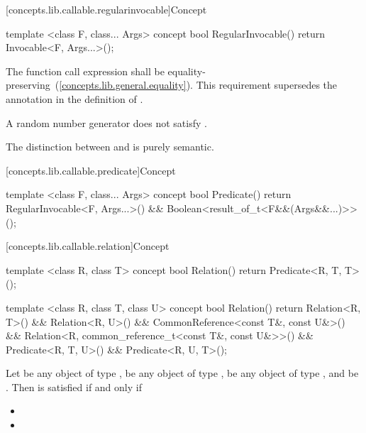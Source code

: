 [concepts.lib.callable.regularinvocable]{Concept }

%
\begin{itemdecl}
template <class F, class... Args>
concept bool RegularInvocable() {
  return Invocable<F, Args...>();
}
\end{itemdecl}

\begin{itemdescr}
\pnum
The  function call expression shall be
equality-preserving~(\ref{concepts.lib.general.equality}). \enternote This requirement supersedes the
annotation in the definition of . \exitnote

\pnum
\enternote A random number generator does not satisfy
.\exitnote

\pnum
\enternote The distinction between  and
 is purely semantic.\exitnote
\end{itemdescr}

[concepts.lib.callable.predicate]{Concept }

%
\begin{itemdecl}
template <class F, class... Args>
concept bool Predicate() {
  return RegularInvocable<F, Args...>() &&
    Boolean<result_of_t<F&&(Args&&...)>>();
}
\end{itemdecl}

[concepts.lib.callable.relation]{Concept }

%
\begin{itemdecl}
template <class R, class T>
concept bool Relation() {
  return Predicate<R, T, T>();
}

template <class R, class T, class U>
concept bool Relation() {
  return Relation<R, T>() &&
    Relation<R, U>() &&
    CommonReference<const T&, const U&>() &&
    Relation<R,
      common_reference_t<const T&, const U&>>() &&
    Predicate<R, T, U>() &&
    Predicate<R, U, T>();
}
\end{itemdecl}

\begin{itemdescr}
\pnum
Let  be any object of type ,  be any
object of type ,  be any
object of type , and  be
.
Then  is satisfied if and only if

\begin{itemize}
\item {}
\item {}
\end{itemize}
\end{itemdescr}

